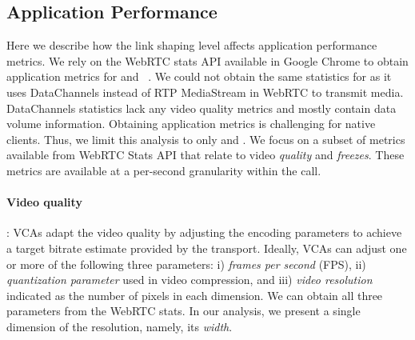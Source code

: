 \subsection{Application Performance}
\label{subsec:application_performance}
Here we describe how the link shaping level affects application performance metrics. %
We rely on the WebRTC stats API available in Google Chrome to obtain application metrics for \teamsbrowser and \meet~\cite{webrtc_stats}. We could not obtain the same statistics for \zoombrowser as it uses DataChannels instead of RTP MediaStream in WebRTC to transmit media. DataChannels statistics lack any video quality metrics and mostly contain data volume information. Obtaining application metrics is challenging for native clients.  %
Thus, we limit this analysis to only \meet and \teamsbrowser. We focus on a subset of metrics available from WebRTC Stats API that relate to video \textit{quality} and \textit{freezes}. These metrics are available at a per-second granularity within the call. %


\paragraph{Video quality}: VCAs adapt the video quality by adjusting the encoding parameters to achieve a target bitrate estimate provided by the transport. Ideally, VCAs can adjust one or more of the following three parameters: i) \emph{frames per second} (FPS), ii) \textit{quantization parameter} used in video compression, and  iii) \textit{video resolution} indicated as the number of pixels in each dimension. We can obtain all three parameters from the WebRTC stats. In our analysis, we present a single dimension of the resolution, namely, its \textit{width}. 

